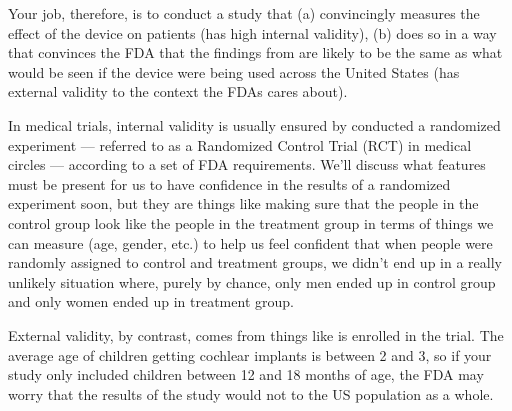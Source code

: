 \documentclass[letterpaper,10pt,english]{jupyterBook}
\begin{document}
\sphinxAtStartPar
Your job, therefore, is to conduct a study that (a) convincingly measures the effect of the device on patients (has high internal validity),  (b) does so in a way that convinces the FDA that the findings from  are likely to be the same as what would be seen if the device were being used across the United States (has external validity to the context the FDAs cares about).

\sphinxAtStartPar
In medical trials, internal validity is usually ensured by conducted a randomized experiment — referred to as a Randomized Control Trial (RCT) in medical circles — according to a set of FDA requirements. We’ll discuss what features must be present for us to have confidence in the results of a randomized experiment soon, but they are things like making sure that the people in the control group look like the people in the treatment group in terms of things we can measure (age, gender, etc.) to help us feel confident that when people were randomly assigned to control and treatment groups, we didn’t end up in a really unlikely situation where, purely by chance, only men ended up in control group and only women ended up in treatment group.

\sphinxAtStartPar
External validity, by contrast, comes from things like  is enrolled in the trial. The average age of children getting cochlear implants is between 2 and 3, so if your study only included children between 12 and 18 months of age, the FDA may worry that the results of the study would not  to the US population as a whole.
\end{document}
